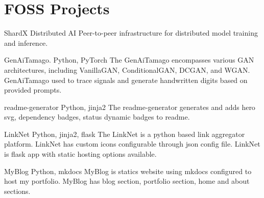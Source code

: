 \documentclass[fontsize=11pt]{tccv}
\begin{document}
\section{FOSS Projects}

\begin{project}
    \item{ShardX}
    {Distributed AI}
    {Peer-to-peer infrastructure for distributed model training and inference.}
\end{project}
\vspace{1em}

\vspace{1em}
\begin{project}
	\item{ GenAiTamago.}
	{Python, PyTorch}
	{The GenAiTamago encompasses various GAN architectures, including VanillaGAN, ConditionalGAN, DCGAN, and WGAN. GenAiTamago used to trace signals and generate handwritten digits based on provided prompts.}\\
\end{project}	
\vspace{1em}

\vspace{1em}
\begin{project}
	\item{ readme-generator}
	{Python, jinja2}
	{The readme-generator generates and adds hero svg, dependency badges, status dynamic badges to readme.}\\
\end{project}	
\vspace{1em}

\vspace{1em}
\begin{project}
	\item{ LinkNet}
	{Python, jinja2, flask}
	{The LinkNet is a python based link aggregator platform. LinkNet has custom icons configurable through json config file.
    LinkNet is flask app with static hosting options available.}\\
\end{project}	
\vspace{1em}

\vspace{1em}
\begin{project}
	\item{ MyBlog }
	{Python,  mkdocs}
	{MyBlog is statics website using mkdocs configured to host my portfolio. MyBlog has blog section, portfolio section, home and about sections.}\\
\end{project}	
\vspace{1em}
\end{document}
